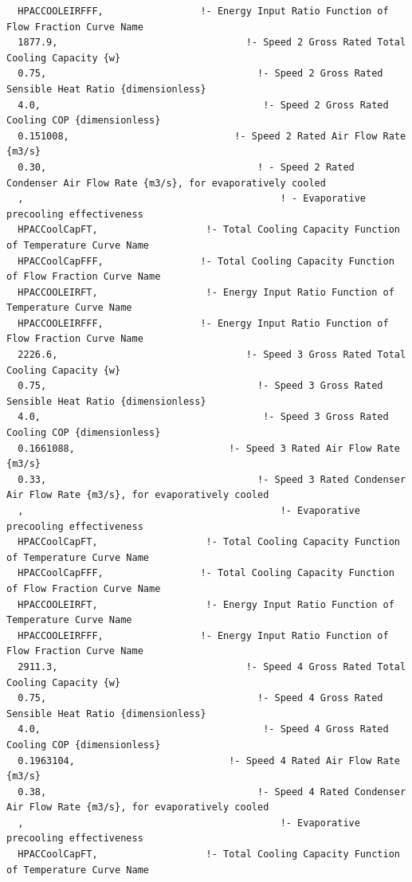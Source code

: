 \begin{lstlisting}
  HPACCOOLEIRFFF,                 !- Energy Input Ratio Function of Flow Fraction Curve Name
  1877.9,                                 !- Speed 2 Gross Rated Total Cooling Capacity {w}
  0.75,                                     !- Speed 2 Gross Rated Sensible Heat Ratio {dimensionless}
  4.0,                                       !- Speed 2 Gross Rated Cooling COP {dimensionless}
  0.151008,                             !- Speed 2 Rated Air Flow Rate {m3/s}
  0.30,                                     ! - Speed 2 Rated Condenser Air Flow Rate {m3/s}, for evaporatively cooled
  ,                                             ! - Evaporative precooling effectiveness
  HPACCoolCapFT,                   !- Total Cooling Capacity Function of Temperature Curve Name
  HPACCoolCapFFF,                 !- Total Cooling Capacity Function of Flow Fraction Curve Name
  HPACCOOLEIRFT,                   !- Energy Input Ratio Function of Temperature Curve Name
  HPACCOOLEIRFFF,                 !- Energy Input Ratio Function of Flow Fraction Curve Name
  2226.6,                                 !- Speed 3 Gross Rated Total Cooling Capacity {w}
  0.75,                                     !- Speed 3 Gross Rated Sensible Heat Ratio {dimensionless}
  4.0,                                       !- Speed 3 Gross Rated Cooling COP {dimensionless}
  0.1661088,                           !- Speed 3 Rated Air Flow Rate {m3/s}
  0.33,                                     !- Speed 3 Rated Condenser Air Flow Rate {m3/s}, for evaporatively cooled
  ,                                             !- Evaporative precooling effectiveness
  HPACCoolCapFT,                   !- Total Cooling Capacity Function of Temperature Curve Name
  HPACCoolCapFFF,                 !- Total Cooling Capacity Function of Flow Fraction Curve Name
  HPACCOOLEIRFT,                   !- Energy Input Ratio Function of Temperature Curve Name
  HPACCOOLEIRFFF,                 !- Energy Input Ratio Function of Flow Fraction Curve Name
  2911.3,                                 !- Speed 4 Gross Rated Total Cooling Capacity {w}
  0.75,                                     !- Speed 4 Gross Rated Sensible Heat Ratio {dimensionless}
  4.0,                                       !- Speed 4 Gross Rated Cooling COP {dimensionless}
  0.1963104,                           !- Speed 4 Rated Air Flow Rate {m3/s}
  0.38,                                     !- Speed 4 Rated Condenser Air Flow Rate {m3/s}, for evaporatively cooled
  ,                                             !- Evaporative precooling effectiveness
  HPACCoolCapFT,                   !- Total Cooling Capacity Function of Temperature Curve Name

\end{lstlisting}

